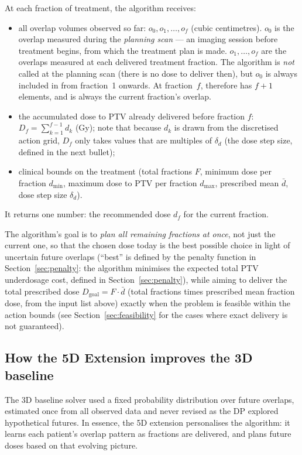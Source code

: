 \documentclass[11pt]{article}
\DeclareRobustCommand{\code}[1]{\ifmmode\text{\texttt{\detokenize{#1}}}\else\texttt{\detokenize{#1}}\fi}
\newcommand{\Dgoal}{D_{\mathrm{goal}}}
\newcommand{\dmin}{d_{\min}}
\newcommand{\dmax}{d_{\max}}
\newcommand{\dmean}{\bar{d}}
\theoremstyle{definition}
\begin{document}
At each fraction of treatment, the algorithm receives:
\begin{itemize}
  \item all overlap volumes observed so far: $o_0, o_1, \ldots, o_f$
        (cubic centimetres).  $o_0$ is the overlap measured during the
        \emph{planning scan} --- an imaging session before treatment
        begins, from which the treatment plan is made.  $o_1, \ldots, o_f$
        are the overlaps measured at each delivered treatment fraction.
        The algorithm is \emph{not} called at the planning scan (there is
        no dose to deliver then), but $o_0$ is always included in
        \code{volumes} from fraction~1 onwards.  At fraction~$f$,
        \code{volumes} therefore has $f + 1$ elements, and
        \code{volumes[-1]} is always the current fraction's overlap.
  \item the accumulated dose to PTV already delivered before fraction $f$:
        $D_f = \sum_{k=1}^{f-1} d_k$ (Gy); note that because $d_k$ is drawn
        from the discretised action grid, $D_f$ only takes values that are
        multiples of $\delta_d$ (the dose step size, defined in the next bullet);
  \item clinical bounds on the treatment (total fractions $F$, minimum
        dose per fraction $\dmin$, maximum dose to PTV per fraction $\dmax$, prescribed mean
        $\dmean$, dose step size $\delta_d$).
\end{itemize}
It returns one number: the recommended dose $d_f$ for the current fraction.

The algorithm's goal is to \emph{plan all remaining fractions at once}, not
just the current one, so that the chosen dose today is the best possible
choice in light of uncertain future overlaps (``best'' is defined by the
penalty function in Section~\ref{sec:penalty}: the algorithm minimises the
expected total PTV underdosage cost, defined in Section~\ref{sec:penalty}), while aiming to deliver the
total prescribed dose $\Dgoal = F \cdot \dmean$ (total fractions times
prescribed mean fraction dose, from the input list above) exactly when the
problem
is feasible within the action bounds (see Section~\ref{sec:feasibility}
for the cases where exact delivery is not guaranteed).

\subsection{How the 5D Extension improves the 3D baseline}

The 3D baseline solver used a fixed probability distribution over future overlaps,
estimated once from all observed data and never revised as the DP explored
hypothetical futures.  In essence, the 5D extension personalises the algorithm: it
learns each patient's overlap pattern as fractions are delivered, and plans
future doses based on that evolving picture.
\end{document}
